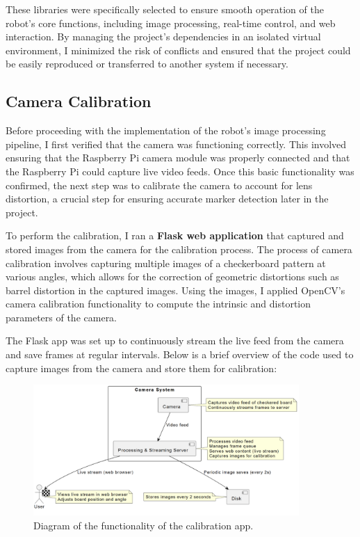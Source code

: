 These libraries were specifically selected to ensure smooth operation of the robot’s core functions, including image processing, real-time control, and web interaction. By managing the project’s dependencies in an isolated virtual environment, I minimized the risk of conflicts and ensured that the project could be easily reproduced or transferred to another system if necessary.

\subsection{Camera Calibration}

Before proceeding with the implementation of the robot’s image processing pipeline, I first verified that the camera was functioning correctly. This involved ensuring that the Raspberry Pi camera module was properly connected and that the Raspberry Pi could capture live video feeds. Once this basic functionality was confirmed, the next step was to calibrate the camera to account for lens distortion, a crucial step for ensuring accurate marker detection later in the project.

To perform the calibration, I ran a \textbf{Flask web application} that captured and stored images from the camera for the calibration process. The process of camera calibration involves capturing multiple images of a checkerboard pattern at various angles, which allows for the correction of geometric distortions such as barrel distortion in the captured images. Using the images, I applied OpenCV’s camera calibration functionality to compute the intrinsic and distortion parameters of the camera.

The Flask app was set up to continuously stream the live feed from the camera and save frames at regular intervals. Below is a brief overview of the code used to capture images from the camera and store them for calibration:

\begin{figure}[H]
	\centering
	\includegraphics[width=0.9\textwidth]{ch4/figs/calibration.png}
	\caption{Diagram of the functionality of the calibration app.}
	\label{fig:calibration}
\end{figure}

